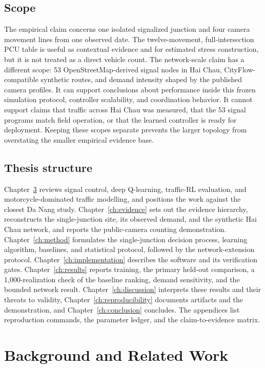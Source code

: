 \documentclass[12pt,a4paper]{report}
\begin{document}
\section{Scope}
The empirical claim concerns one isolated signalized junction and four camera movement lines from one observed date. The twelve-movement, full-intersection PCU table is useful as contextual evidence and for estimated stress construction, but it is not treated as a direct vehicle count. The network-scale claim has a different scope: 53 OpenStreetMap-derived signal nodes in Hai Chau, CityFlow-compatible synthetic routes, and demand intensity shaped by the published camera profiles. It can support conclusions about performance inside this frozen simulation protocol, controller scalability, and coordination behavior. It cannot support claims that traffic across Hai Chau was measured, that the 53 signal programs match field operation, or that the learned controller is ready for deployment. Keeping these scopes separate prevents the larger topology from overstating the smaller empirical evidence base.

\section{Thesis structure}
Chapter~\ref{ch:background} reviews signal control, deep Q-learning, traffic-RL evaluation, and motorcycle-dominated traffic modelling, and positions the work against the closest Da Nang study. Chapter~\ref{ch:evidence} sets out the evidence hierarchy, reconstructs the single-junction site, its observed demand, and the synthetic Hai Chau network, and reports the public-camera counting demonstration. Chapter~\ref{ch:method} formulates the single-junction decision process, learning algorithm, baselines, and statistical protocol, followed by the network-extension protocol. Chapter~\ref{ch:implementation} describes the software and its verification gates. Chapter~\ref{ch:results} reports training, the primary held-out comparison, a 1,000-realization check of the baseline ranking, demand sensitivity, and the bounded network result. Chapter~\ref{ch:discussion} interprets these results and their threats to validity, Chapter~\ref{ch:reproducibility} documents artifacts and the demonstration, and Chapter~\ref{ch:conclusion} concludes. The appendices list reproduction commands, the parameter ledger, and the claim-to-evidence matrix.

\chapter{Background and Related Work}\label{ch:background}
\end{document}
